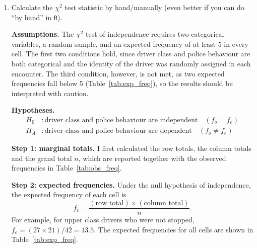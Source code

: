 \documentclass[12pt,letterpaper]{article}
\begin{document}
	\begin{enumerate}
		
		\item [(a)]
		Calculate the $\chi^2$ test statistic by hand/manually (even better if you can do ``by hand'' in \texttt{R}).
		
		\vspace{.25cm}
		
		\noindent\textbf{Assumptions.} The $\chi^2$ test of independence requires two categorical variables, a random sample, and an expected frequency of at least 5 in every cell. The first two conditions hold, since driver class and police behaviour are both categorical and the identity of the driver was randomly assigned in each encounter. The third condition, however, is not met, as two expected frequencies fall below 5 (Table~\ref{tab:exp_freq}), so the results should be interpreted with caution.
		
		\vspace{.25cm}
		\noindent\textbf{Hypotheses.}
		\begin{align*}
			H_0 &: \text{driver class and police behaviour are independent} \quad (f_o = f_e)\\
			H_A &: \text{driver class and police behaviour are dependent} \quad (f_o \neq f_e)
		\end{align*}
		
		\noindent\textbf{Step 1: marginal totals.} I first calculated the row totals, the column totals and the grand total $n$, which are reported together with the observed frequencies in Table~\ref{tab:obs_freq}.
		
		
		
		
		
		
		\noindent\textbf{Step 2: expected frequencies.} Under the null hypothesis of independence, the expected frequency of each cell is
		\begin{equation*}
			f_e = \frac{(\text{row total}) \times (\text{column total})}{n}.
		\end{equation*}
		For example, for upper class drivers who were not stopped, $f_e = (27 \times 21)/42 = 13.5$. The expected frequencies for all cells are shown in Table~\ref{tab:exp_freq}.
		
		
		
		
		

\end{enumerate}
\end{document}
